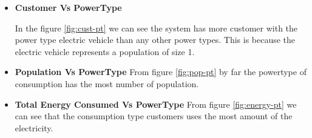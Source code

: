 \begin{itemize}
\item \textbf{Customer Vs PowerType}

In the figure \ref{fig:cust-pt} we can see the system has more customer with the power type electric vehicle than any other power types. This is because the electric vehicle represents a population of size 1.

\item \textbf{Population Vs PowerType}
From figure \ref{fig:pop-pt} by far the powertype of consumption has the most number of population.

\item \textbf{Total Energy Consumed Vs PowerType}
From figure \ref{fig:energy-pt} we can see that the consumption type customers uses the most amount of the electricity.



\end{itemize}
